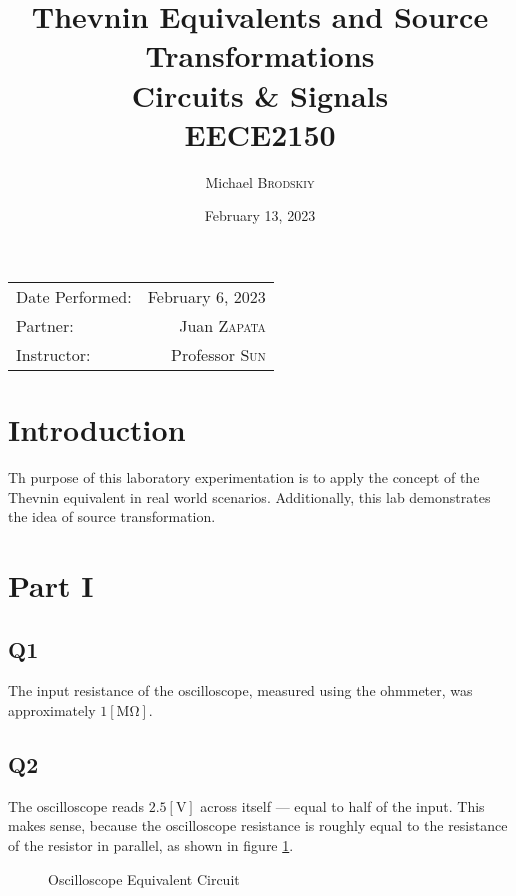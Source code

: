 \documentclass[
	letterpaper, %
	10pt, %
]{CSUniSchoolLabReport}
\title{Thevnin Equivalents and Source Transformations \\ Circuits \& Signals \\ EECE2150} %
\author{Michael \textsc{Brodskiy}}
\date{February 13, 2023} %
\begin{document}
\maketitle %

\begin{center}
	\begin{tabular}{l r}
		Date Performed: & February 6, 2023 \\ %
        Partner: & Juan \textsc{Zapata} \\ %
		Instructor: & Professor \textsc{Sun} %
	\end{tabular}
\end{center}

\setcounter{section}{-1}

\section{Introduction}

Th purpose of this laboratory experimentation is to apply the concept of the Thevnin equivalent in real world scenarios. Additionally, this lab demonstrates the idea of source transformation.

\section{Part I}

\subsection{Q1} The input resistance of the oscilloscope, measured using the ohmmeter, was approximately $1[\si{\mega\ohm}]$.

\subsection{Q2} The oscilloscope reads $2.5[\si{\volt}]$ across itself — equal to half of the input. This makes sense, because the oscilloscope resistance is roughly equal to the resistance of the resistor in parallel, as shown in figure \ref{fig:1}.

\begin{figure}[H]
  \centering
  
  \caption{Oscilloscope Equivalent Circuit}
  \label{fig:1}
\end{figure}
\end{document}
